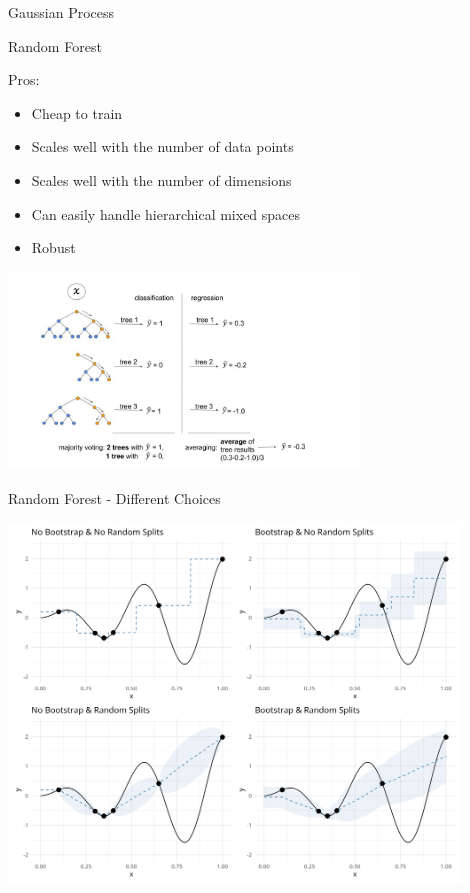 \documentclass[11pt,compress,t,notes=noshow, xcolor=table]{beamer}
\begin{document}
\begin{vbframe}{Gaussian Process}
\end{vbframe}

\begin{frame}{Random Forest}

Pros:
\begin{itemize}
 \item Cheap to train
 \item Scales well with the number of data points
 \item Scales well with the number of dimensions
 \item Can easily handle hierarchical mixed spaces
 \item Robust
\end{itemize}

\begin{center}
  \includegraphics[width = 0.7\textwidth]{slides/010-bayesian-optimization/figure_man/random_forests.jpg}
\end{center}

\end{frame}


\begin{frame}{Random Forest - Different Choices}

\begin{center}
  \includegraphics[width = 0.9\textwidth]{figure_man/surrogate_2.png}\\
\end{center}

\end{frame}
\end{document}
